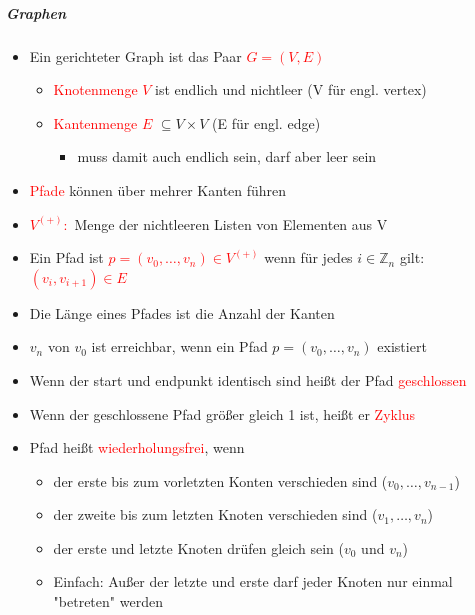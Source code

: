 \documentclass[12pt]{article}
\begin{document}
\subparagraph{\large Graphen}
\normalsize
\begin{flushleft}
    \vspace{0.5cm}
    \begin{itemize}
        \item Ein gerichteter Graph ist das Paar \textcolor{red}{$G = (V,E)$}
        \begin{itemize}
            \item \textcolor{red}{Knotenmenge $V$} ist endlich und nichtleer (V für engl. vertex)
            \item \textcolor{red}{Kantenmenge $E$} $\subseteq V \times V$  (E für engl. edge)
            \begin{itemize}
                \item muss damit auch endlich sein, darf aber leer sein
            \end{itemize}
        \end{itemize}
        \item \textcolor{red}{Pfade} können über mehrer Kanten führen
        \item \textcolor{red}{$V^{(+)}:$} Menge der nichtleeren Listen von Elementen aus V
        \item Ein Pfad ist \textcolor{red}{$p=(v_0,\dots ,v_n) \in V^{(+)}$} wenn für jedes $i \in \mathbb{Z}_n$ gilt: \textcolor{red}{$(v_i,v_{i+1})\in E$}
        \item Die Länge eines Pfades ist die Anzahl der Kanten
        \item $v_n$ von $v_0$ ist erreichbar, wenn ein Pfad $p = (v_0,\dots ,v_n)$ existiert
        \item Wenn der start und endpunkt identisch sind heißt der Pfad \textcolor{red}{geschlossen}
        \item Wenn der geschlossene Pfad größer gleich 1 ist, heißt er \textcolor{red}{Zyklus}
        \item Pfad heißt \textcolor{red}{wiederholungsfrei}, wenn
        \begin{itemize}
            \item der erste bis zum vorletzten Konten verschieden sind ($v_0,\dots ,v_{n-1}$)
            \item der zweite bis zum letzten Knoten verschieden sind ($v_1,\dots ,v_n$)
            \item der erste und letzte Knoten drüfen gleich sein ($v_0$ und $v_n$)
            \item Einfach: Außer der letzte und erste darf jeder Knoten nur einmal "betreten" werden

\end{itemize}
\end{itemize}
\end{flushleft}
\end{document}
